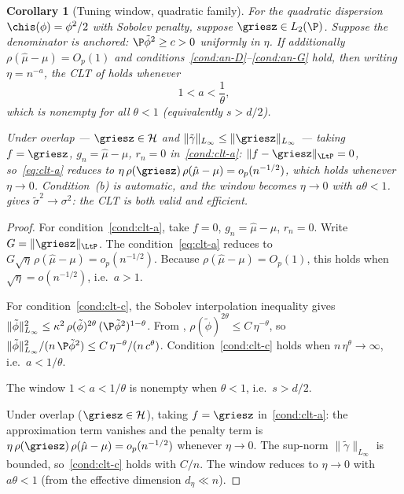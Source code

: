 \documentclass{article}
\newtheorem{corollary}[theorem]{Corollary}
\begin{document}
\begin{corollary}[Tuning window, quadratic family]
\label{cor:tuning-window}
For the quadratic dispersion
$\chis(\phi) = \phi^2/2$
with Sobolev penalty,
suppose $\griesz \in L_2(\P)$.
Suppose the denominator is anchored:
$\P\tilde\phi^2 \ge c > 0$
uniformly in $\eta$.
If additionally
$\rho(\hat\mu - \mu) = O_p(1)$
and conditions~\ref{cond:an-D}--\ref{cond:an-G} hold,
then writing $\eta = n^{-a}$,
the CLT of
holds whenever
\begin{equation}
\label{eq:general-lambda-window}
1 < a < \frac{1}{\theta},
\end{equation}
which is nonempty for all $\theta < 1$
(equivalently $s > d/2$).

Under overlap
--- $\griesz \in \mathcal{H}$
and $\|\tilde\gamma\|_{L_\infty}
  \le \|\griesz\|_{L_\infty}$ ---
taking $f = \griesz$,
$g_n = \hat\mu - \mu$, $r_n = 0$
in~\ref{cond:clt-a}:
$\|f - \griesz\|_{\LtP} = 0$,
so~\eqref{eq:clt-a} reduces to
$\eta\,\rho(\griesz)\,\rho(\hat\mu-\mu)
  = o_p(n^{-1/2})$,
which holds whenever $\eta \to 0$.
Condition~(b) is automatic,
and the window
becomes $\eta \to 0$ with $a\theta < 1$.
gives $\tilde\sigma^2 \to \sigma^2$:
the CLT is both valid and efficient.
\end{corollary}

\begin{proof}
For condition~\ref{cond:clt-a},
take $f = 0$, $g_n = \hat\mu - \mu$, $r_n = 0$.
Write $G = \|\griesz\|_{\LtP}$.
The condition~\eqref{eq:clt-a} reduces to
$G\sqrt{\eta}\,\rho(\hat\mu - \mu)
  = o_p(n^{-1/2})$.
Because $\rho(\hat\mu - \mu) = O_p(1)$,
this holds
when $\sqrt{\eta} = o(n^{-1/2})$,
i.e.\ $a > 1$.

For condition~\ref{cond:clt-c},
the Sobolev interpolation inequality gives
$\|\tilde\phi\|_{L_\infty}^2
  \le \kappa^2\,\rho(\tilde\phi)^{2\theta}\,
      (\P\tilde\phi^2)^{1-\theta}$.
From ,
$\rho(\tilde\phi)^{2\theta}
  \le C\,\eta^{-\theta}$,
so
$\|\tilde\phi\|_{L_\infty}^2
  / (n\,\P\tilde\phi^2)
  \le C\,\eta^{-\theta}
       / (n\,c^\theta)$.
Condition~\ref{cond:clt-c} holds when
$n\,\eta^{\theta} \to \infty$,
i.e.\ $a < 1/\theta$.

The window $1 < a < 1/\theta$
is nonempty when $\theta < 1$,
i.e.\ $s > d/2$.

Under overlap ($\griesz \in \mathcal{H}$),
taking $f = \griesz$ in~\ref{cond:clt-a}:
the approximation term vanishes
and the penalty term is
$\eta\,\rho(\griesz)\,\rho(\hat\mu-\mu) = o_p(n^{-1/2})$
whenever $\eta \to 0$.
The sup-norm $\|\tilde\gamma\|_{L_\infty}$
is bounded,
so~\ref{cond:clt-c} holds with $C/n$.
The window reduces to $\eta \to 0$
with $a\theta < 1$
(from the effective dimension
$d_\eta \ll n$).
\end{proof}
\end{document}
